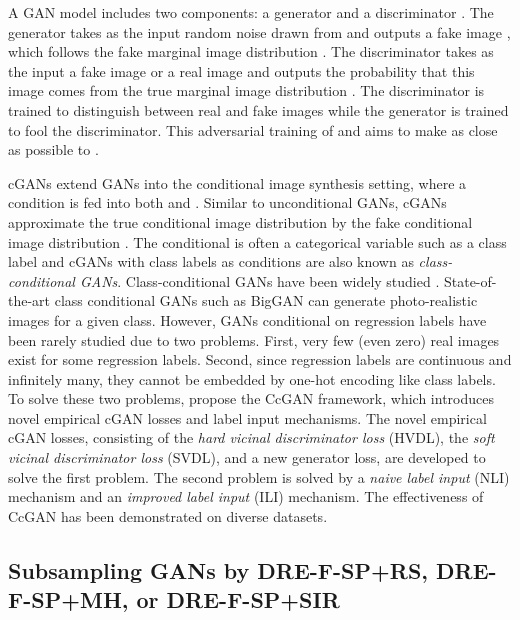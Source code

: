 \documentclass[10pt, twocolumn]{article}
\theoremstyle{definition}
\begin{document}
A GAN model \cite{goodfellow2014generative} includes two components: a generator  and a discriminator . The generator  takes as the input random noise drawn from  and outputs a fake image , which follows the fake marginal image distribution . The discriminator takes as the input a fake image  or a real image  and outputs the probability that this image comes from the true marginal image distribution . The discriminator is trained to distinguish between real and fake images while the generator is trained to fool the discriminator. This adversarial training of  and  aims to make  as close as possible to . 

cGANs \cite{mirza2014conditional} extend GANs \cite{goodfellow2014generative} into the conditional image synthesis setting, where a condition  is fed into both  and . Similar to unconditional GANs, cGANs approximate the true conditional image distribution  by the fake conditional image distribution . The conditional  is often a categorical variable such as a class label and cGANs with class labels as conditions are also known as \textit{class-conditional GANs}. Class-conditional GANs have been widely studied \cite{odena2017conditional, miyato2018cgans, brock2018large, zhang2019self}. State-of-the-art class conditional GANs such as BigGAN \cite{brock2018large} can generate photo-realistic images for a given class. However, GANs conditional on regression labels have been rarely studied due to two problems. First, very few (even zero) real images exist for some regression labels. Second, since regression labels are continuous and infinitely many, they cannot be embedded by one-hot encoding like class labels. To solve these two problems, \cite{ding2020continuous,ding2021ccgan} propose the CcGAN framework, which introduces novel empirical cGAN losses and label input mechanisms. The novel empirical cGAN losses, consisting of the \textit{hard vicinal discriminator loss} (HVDL), the \textit{soft vicinal discriminator loss} (SVDL), and a new generator loss, are developed to solve the first problem. The second problem is solved by a \textit{naive label input} (NLI) mechanism and an \textit{improved label input} (ILI) mechanism. The effectiveness of CcGAN has been demonstrated on diverse datasets.  

\subsection{Subsampling GANs by DRE-F-SP+RS, DRE-F-SP+MH, or DRE-F-SP+SIR}\label{sec:related_DRE-F-SP}
\end{document}
